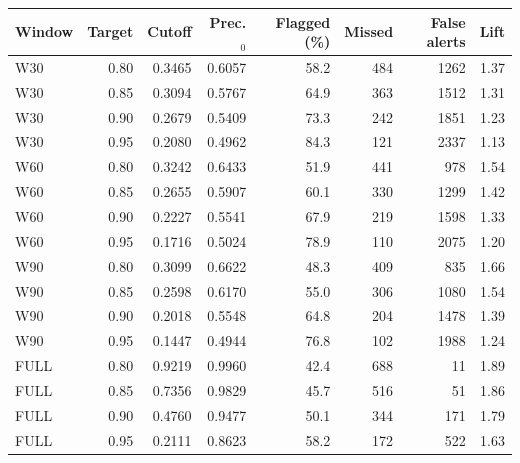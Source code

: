 \small
\setlength{\tabcolsep}{4pt}
\begin{tabular}{@{}lrrrrrrr@{}}
\toprule
Window & Target & Cutoff & Prec.$_0$ & Flagged (\%) & Missed & False alerts & Lift \\
\midrule
W30 & 0.80 & 0.3465 & 0.6057 & 58.2 & 484 & 1262 & 1.37 \\
W30 & 0.85 & 0.3094 & 0.5767 & 64.9 & 363 & 1512 & 1.31 \\
W30 & 0.90 & 0.2679 & 0.5409 & 73.3 & 242 & 1851 & 1.23 \\
W30 & 0.95 & 0.2080 & 0.4962 & 84.3 & 121 & 2337 & 1.13 \\
W60 & 0.80 & 0.3242 & 0.6433 & 51.9 & 441 & 978 & 1.54 \\
W60 & 0.85 & 0.2655 & 0.5907 & 60.1 & 330 & 1299 & 1.42 \\
W60 & 0.90 & 0.2227 & 0.5541 & 67.9 & 219 & 1598 & 1.33 \\
W60 & 0.95 & 0.1716 & 0.5024 & 78.9 & 110 & 2075 & 1.20 \\
W90 & 0.80 & 0.3099 & 0.6622 & 48.3 & 409 & 835 & 1.66 \\
W90 & 0.85 & 0.2598 & 0.6170 & 55.0 & 306 & 1080 & 1.54 \\
W90 & 0.90 & 0.2018 & 0.5548 & 64.8 & 204 & 1478 & 1.39 \\
W90 & 0.95 & 0.1447 & 0.4944 & 76.8 & 102 & 1988 & 1.24 \\
FULL & 0.80 & 0.9219 & 0.9960 & 42.4 & 688 & 11 & 1.89 \\
FULL & 0.85 & 0.7356 & 0.9829 & 45.7 & 516 & 51 & 1.86 \\
FULL & 0.90 & 0.4760 & 0.9477 & 50.1 & 344 & 171 & 1.79 \\
FULL & 0.95 & 0.2111 & 0.8623 & 58.2 & 172 & 522 & 1.63 \\
\bottomrule
\end{tabular}

